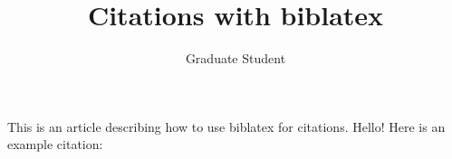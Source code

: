 \documentclass{article}
\title{Citations with biblatex}
\author{Graduate Student}
\begin{document}
\maketitle

This is an article describing how to use biblatex for citations. Hello! 
Here is an example citation: \cite[eg][inter alia]{yadav-sharp-bethard:2018:S18-2}

\printbibliography
\end{document}
